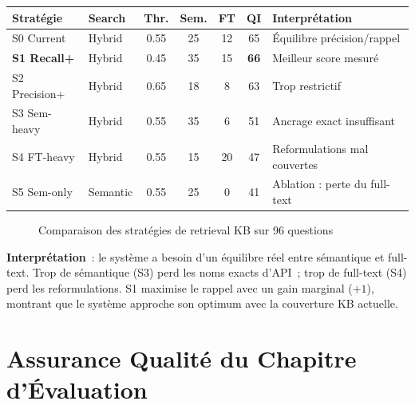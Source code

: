 \begin{longtable}{p{2cm}p{2cm}ccccp{4cm}}
\toprule
\textbf{Stratégie} & \textbf{Search} & \textbf{Thr.} & \textbf{Sem.} & \textbf{FT} & \textbf{QI} & \textbf{Interprétation} \\
\midrule
S0 Current & Hybrid & 0.55 & 25 & 12 & 65 & Équilibre précision/rappel \\
\textbf{S1 Recall+} & Hybrid & 0.45 & 35 & 15 & \textbf{66} & Meilleur score mesuré \\
S2 Precision+ & Hybrid & 0.65 & 18 & 8 & 63 & Trop restrictif \\
S3 Sem-heavy & Hybrid & 0.55 & 35 & 6 & 51 & Ancrage exact insuffisant \\
S4 FT-heavy & Hybrid & 0.55 & 15 & 20 & 47 & Reformulations mal couvertes \\
S5 Sem-only & Semantic & 0.55 & 25 & 0 & 41 & Ablation : perte du full-text \\
\bottomrule
\end{longtable}

\begin{figure}[H]
\centering
{}
\caption{Comparaison des stratégies de retrieval KB sur 96 questions}
\label{fig:strategies_retrieval}
\end{figure}

\textbf{Interprétation}~: le système a besoin d'un équilibre réel entre sémantique et full-text. Trop de sémantique (S3) perd les noms exacts d'API~; trop de full-text (S4) perd les reformulations. S1 maximise le rappel avec un gain marginal ($+1$), montrant que le système approche son optimum avec la couverture KB actuelle.

\section{Assurance Qualité du Chapitre d'Évaluation}
\label{sec:controle_qualite_chapitre}

